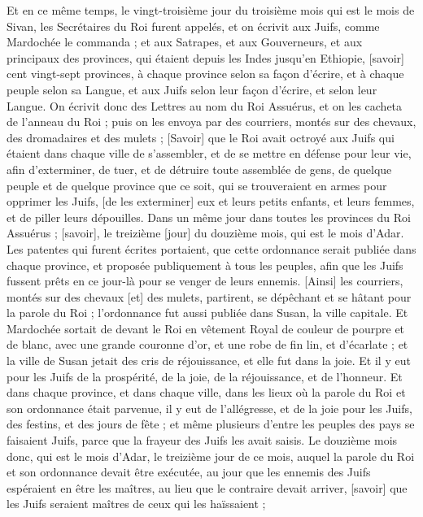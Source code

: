 \begin{multicols}{2}
Et en ce même temps, le vingt-troisième jour du troisième mois qui est le mois de Sivan, les Secrétaires du Roi furent appelés, et on écrivit aux Juifs, comme Mardochée le commanda ; et aux Satrapes, et aux Gouverneurs, et aux principaux des provinces, qui étaient depuis les Indes jusqu'en Ethiopie, [savoir] cent vingt-sept provinces, à chaque province selon sa façon d'écrire, et à chaque peuple selon sa Langue, et aux Juifs selon leur façon d'écrire, et selon leur Langue.
On écrivit donc des Lettres au nom du Roi Assuérus, et on les cacheta de l'anneau du Roi ; puis on les envoya par des courriers, montés sur des chevaux, des dromadaires et des mulets ;
[Savoir] que le Roi avait octroyé aux Juifs qui étaient dans chaque ville de s'assembler, et de se mettre en défense pour leur vie, afin d'exterminer, de tuer, et de détruire toute assemblée de gens, de quelque peuple et de quelque province que ce soit, qui se trouveraient en armes pour opprimer les Juifs, [de les exterminer] eux et leurs petits enfants, et leurs femmes, et de piller leurs dépouilles.
Dans un même jour dans toutes les provinces du Roi Assuérus ; [savoir], le treizième [jour] du douzième mois, qui est le mois d'Adar.
Les patentes qui furent écrites portaient, que cette ordonnance serait publiée dans chaque province, et proposée publiquement à tous les peuples, afin que les Juifs fussent prêts en ce jour-là pour se venger de leurs ennemis.
[Ainsi] les courriers, montés sur des chevaux [et] des mulets, partirent, se dépêchant et se hâtant pour la parole du Roi ; l'ordonnance fut aussi publiée dans Susan, la ville capitale.
Et Mardochée sortait de devant le Roi en vêtement Royal de couleur de pourpre et de blanc, avec une grande couronne d'or, et une robe de fin lin, et d'écarlate ; et la ville de Susan jetait des cris de réjouissance, et elle fut dans la joie.
Et il y eut pour les Juifs de la prospérité, de la joie, de la réjouissance, et de l'honneur.
Et dans chaque province, et dans chaque ville, dans les lieux où la parole du Roi et son ordonnance était parvenue, il y eut de l'allégresse, et de la joie pour les Juifs, des festins, et des jours de fête ; et même plusieurs d'entre les peuples des pays se faisaient Juifs, parce que la frayeur des Juifs les avait saisis.
\VerseOne{}Le douzième mois donc, qui est le mois d'Adar, le treizième jour de ce mois, auquel la parole du Roi et son ordonnance devait être exécutée, au jour que les ennemis des Juifs espéraient en être les maîtres, au lieu que le contraire devait arriver, [savoir] que les Juifs seraient maîtres de ceux qui les haïssaient ;

\end{multicols}
